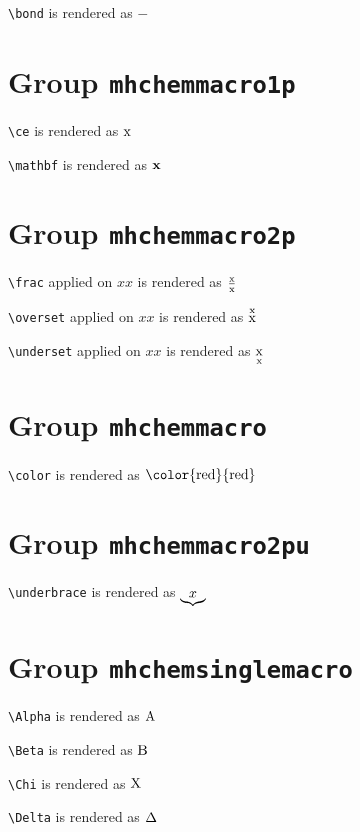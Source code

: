 \texttt{\textbackslash bond} is rendered as $\ce{\bond{-}}$

\section{ Group \texttt{mhchem\textunderscore macro\textunderscore 1p}}

\texttt{\textbackslash ce} is rendered as $\ce{\ce{x}}$

\texttt{\textbackslash mathbf} is rendered as $\ce{\mathbf{x}}$

\section{ Group \texttt{mhchem\textunderscore macro\textunderscore 2p}}

\texttt{\textbackslash frac} applied on ${x}{x}$ is rendered as $\ce{\frac{x}{x}}$

\texttt{\textbackslash overset} applied on ${x}{x}$ is rendered as $\ce{\overset{x}{x}}$

\texttt{\textbackslash underset} applied on ${x}{x}$ is rendered as $\ce{\underset{x}{x}}$

\section{ Group \texttt{mhchem\textunderscore macro\textunderscore 2pc}}

\texttt{\textbackslash color} is rendered as $\ce{\color{red}{red}}$

\section{ Group \texttt{mhchem\textunderscore macro\textunderscore 2pu}}

\texttt{\textbackslash underbrace} is rendered as $\ce{\underbrace{x}}$

\section{ Group \texttt{mhchem\textunderscore single\textunderscore macro}}

\texttt{\textbackslash Alpha} is rendered as $\ce{\Alpha}$

\texttt{\textbackslash Beta} is rendered as $\ce{\Beta}$

\texttt{\textbackslash Chi} is rendered as $\ce{\Chi}$

\texttt{\textbackslash Delta} is rendered as $\ce{\Delta}$

